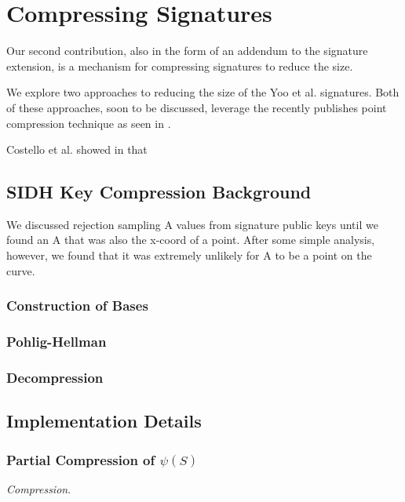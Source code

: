 \chapter{Compressing Signatures}
\label{sec:compress}

Our second contribution, also in the form of an addendum to the \sidh signature extension, is a mechanism for compressing signatures to reduce the size.

We explore two approaches to reducing the size of the Yoo et al. signatures. Both of these approaches, soon to be discussed, leverage the recently publishes point compression technique as seen in \cite{pkcomp}. 

Costello et al. showed in \cite{pkcomp} that  

\section{SIDH Key Compression Background}

We discussed rejection sampling A values from signature public keys until we found an A that was also the x-coord of a point. After some simple analysis, however, we found that it was extremely unlikely for A to be a point on the curve.

\subsection{Construction of Bases}

\subsection{Pohlig-Hellman}

\subsection{Decompression}

\section{Implementation Details}
\label{sec:compimplementation}

\subsection{Partial Compression of $\psi(S)$}

\noindent
\textit{Compression}.\\

